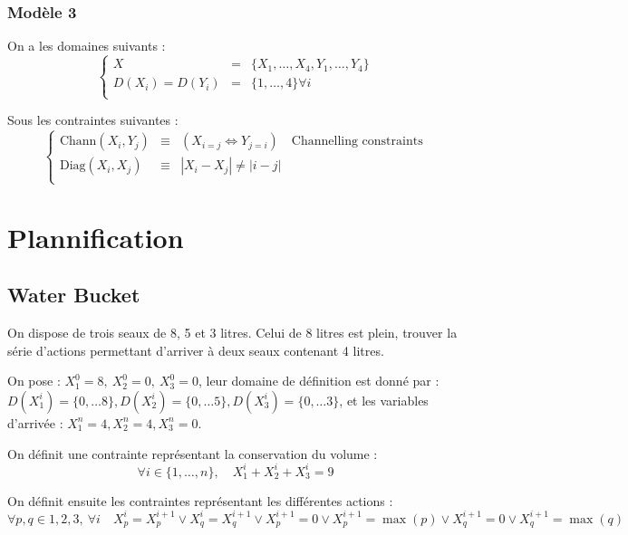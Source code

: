 \documentclass[a4paper,11pt]{thesis}
\begin{document}
\subsubsection{Modèle 3}

On a les domaines suivants :
\begin{displaymath}
    \left \lbrace \begin{array}{rcl}
        X  & = & \{X_1, \dots, X_4, Y_1, \dots, Y_4 \} \\
        D(X_i) = D(Y_i) & = & \{1, \dots, 4\} \forall i\\
    \end{array}
    \right .
\end{displaymath}

Sous les contraintes suivantes :
\begin{displaymath}
    \left \lbrace \begin{array}{rcl}
        \mbox{Chann}(X_i, Y_j) & \equiv & (X_{i = j} \Leftrightarrow Y_{j = i})
        \quad\mbox{Channelling constraints} \\
        \mbox{Diag} (X_i, X_j) & \equiv & |X_i - X_j| \neq |i - j| \\
    \end{array}
    \right .
\end{displaymath}

\section{Plannification}

\subsection{Water Bucket}

On dispose de trois seaux de 8, 5 et 3 litres. Celui de 8 litres est plein, trouver la série
d'actions permettant d'arriver à deux seaux contenant 4 litres.

On pose : $X_1^0 = 8,\ X_2^0 = 0,\ X_3^0 = 0$, leur domaine de définition est donné par : $D(X_1^i) =
\{0, \dots 8\}, D(X_2^i) = \{0, \dots 5\}, D(X_3^i) = \{0, \dots 3\}$, et les variables d'arrivée :
$X_1^n = 4, X_2^n = 4, X_3^n = 0$.

On définit une contrainte représentant la conservation du volume :\begin{displaymath}
    \forall i \in \{1, \dots, n\}, \quad X_1^i + X_2^i + X_3^i = 9
\end{displaymath}

On définit ensuite les contraintes représentant les différentes actions : \begin{displaymath}
    \forall p,q \in 1, 2, 3,\ \forall i \quad X_p^i = X_p^{i+1} \vee X_q^i = X_q^{i+1} \vee
    X_p^{i+1} = 0 \vee X_p^{i+1} = \max(p) \vee X_q^{i+1} = 0 \vee X_q^{i+1} = \max(q)
\end{displaymath}
\end{document}
